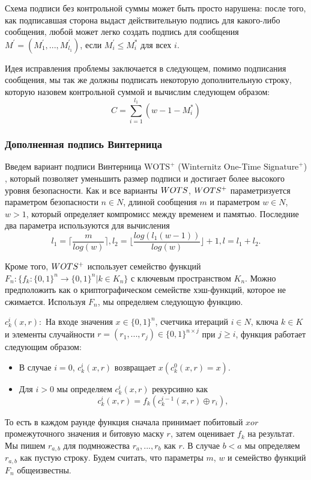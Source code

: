 \documentclass[a4paper, 14pt]{extarticle}
\begin{document}
Схема подписи без контрольной суммы может быть просто нарушена: после того, как подписавшая сторона выдаст действительную подпись для какого-либо сообщения, любой может легко создать подпись для сообщения $M^{'} = (M^{'}_1, ..., M^{'}_{l_{1}})$, если $M^{'}_{i} \leq M^{*}_{i}$ для всех $i$.

Идея исправления проблемы заключается в следующем, помимо подписания сообщения, мы так же должны подписать некоторую дополнительную строку, которую назовем контрольной суммой и вычислим следующем образом:
\[ C = \sum^{l_{1}}_{i = 1}(w - 1 - M^{*}_{i}) \]

\subsubsection{Дополненная подпись Винтерница}
Введем вариант подписи Винтерница $\text{WOTS}^{+}$ ($\text{Winternitz One-Time Signature}^+$) \cite{wotsplus}, который позволяет уменьшить размер подписи и достигает более высокого уровня безопасности. Как и все варианты $W\-OTS$, $W\-OTS^{+}$ параметризуется параметром безопасности $n \in N$, длиной сообщения $m$ и параметром $w \in N$, $w > 1$, который определяет компромисс между временем и памятью. Последние два параметра используются для вычисления
\[ l_{1} = \Bigg \lceil \frac{m}{log(w)} \Bigg \rceil, l_{2} = \Bigg \lfloor \frac{log(l_{1}(w - 1))}{log(w)} \Bigg \rfloor + 1, l = l_{1} + l_{2}. \]

Кроме того, $W\-OTS^{+}$ использует семейство функций $F_{n} : \{f_{k} : \{0, 1\}^{n} \rightarrow \{0, 1\}^{n}|k \in K_{n}\}$ с ключевым пространством $K_{n}$. Можно предположить как о криптографическом семействе хэш-функций, которое не сжимается. Используя $F_{n}$, мы определяем следующую функцию.

$c^{i}_{k}(x, r):$ На входе значения $x \in \{0, 1\}^{n}$, счетчика итераций $i \in N$, ключа $k \in K$ и элементы случайности $r = (r_{1}, ..., r_{j}) \in \{0, 1\}^{n \times j}$ при $j \geq i$, функция работает следующим образом:

\begin{itemize}
    \item В случае $i = 0$, $c^{i}_{k}(x, r)$ возвращает $x(c^{0}_{k}(x, r) = x)$.
    \item Для $i > 0$ мы определяем $c^{i}_{k}(x, r)$ рекурсивно как
    \[ c^{i}_{k}(x, r) = f_{k}(c^{i - 1}_{k}(x, r) \oplus r_{i}) ,\]
\end{itemize}

То есть в каждом раунде функция сначала принимает побитовый $xor$ промежуточного значения и битовую маску $r$, затем оценивает $f_{k}$ на результат. Мы пишем $r_{a,b}$ для подмножества $r_{a}, ..., r_{b}$ как $r$. В случае $b < a$ мы определяем $r_{a,b}$ как пустую строку. Будем считать, что параметры $m$, $w$ и семейство функций $F_{n}$ общеизвестны.
\end{document}
